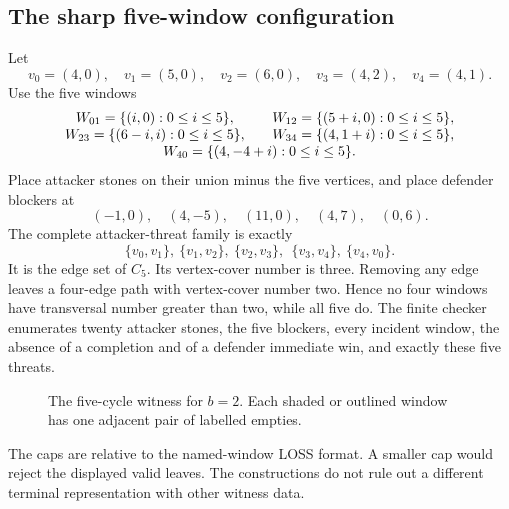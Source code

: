 \subsection{The sharp five-window configuration}

Let
\[
v_0=(4,0),\quad v_1=(5,0),\quad v_2=(6,0),\quad
v_3=(4,2),\quad v_4=(4,1).
\]
Use the five windows
\[
\begin{array}{c@{\qquad}c}
W_{01}=\{(i,0):0\le i\le5\},&
W_{12}=\{(5+i,0):0\le i\le5\},\\
W_{23}=\{(6-i,i):0\le i\le5\},&
W_{34}=\{(4,1+i):0\le i\le5\},\\
\multicolumn{2}{c}{W_{40}=\{(4,-4+i):0\le i\le5\}.}
\end{array}
\]
Place attacker stones on their union minus the five vertices, and place
defender blockers at
\[
(-1,0),\quad(4,-5),\quad(11,0),\quad(4,7),\quad(0,6).
\]
The complete attacker-threat family is exactly
\[
\{v_0,v_1\},\ \{v_1,v_2\},\ \{v_2,v_3\},\
\ \{v_3,v_4\},\ \{v_4,v_0\}.
\]
It is the edge set of $C_5$.  Its vertex-cover number is three.  Removing any
edge leaves a four-edge path with vertex-cover number two.  Hence no four
windows have transversal number greater than two, while all five do.  The
finite checker enumerates twenty attacker stones, the five blockers, every
incident window, the absence of a completion and of a defender immediate
win, and exactly these five threats.

\begin{figure}[tbp]
  \centering
  \caption{The five-cycle witness for $b=2$.  Each shaded or outlined window
  has one adjacent pair of labelled empties.}
  \label{fig:witness-cycle}
\end{figure}

The caps are relative to the named-window LOSS format.  A smaller cap would
reject the displayed valid leaves.  The constructions do not rule out a
different terminal representation with other witness data.
